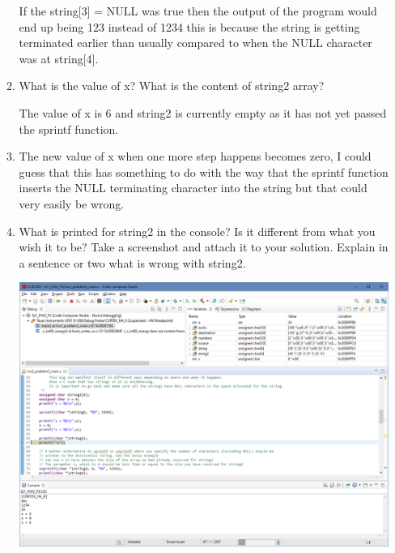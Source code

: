 \documentclass{article}
\begin{document}
\begin{enumerate}
\begin{enumerate}
\begin{center}
            If the string[3] = NULL was true then the output of the program would end up being 123 instead of 1234 this is because the string is getting terminated earlier than usually compared to when the NULL character was at string[4].
        \end{center}
        \addtocounter{enumii}{2}
        \item What is the value of x? What is the content of string2 array?
        \begin{center}
            The value of x is 6 and string2 is currently empty as it has not yet passed the sprintf function.
        \end{center}
        \item
        \begin{center}
            The new value of x when one more step happens becomes zero, I could guess that this has something to do with the way that the sprintf function inserts the NULL terminating character into the string but that could very easily be wrong.
        \end{center}
        \addtocounter{enumii}{1}
        \newpage
        \item What is printed for string2 in the console? Is it different from what you wish it to be? Take a screenshot and attach it to your solution. Explain in a sentence or two what is wrong with string2.
        \begin{center}
            \includegraphics[width = .9\textwidth]{3i.png}
        

\end{center}
\end{enumerate}
\end{enumerate}
\end{document}
